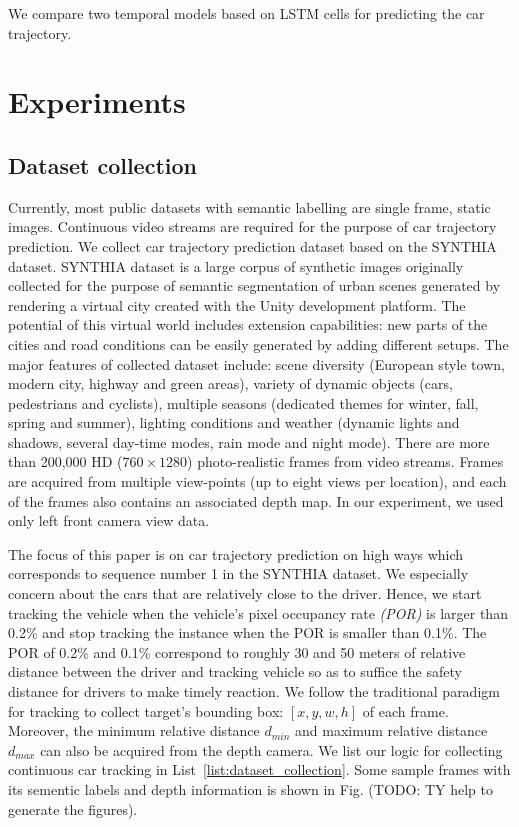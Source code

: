 \documentclass[10pt,twocolumn,letterpaper]{article}
\begin{document}
We compare two temporal models based on LSTM cells for predicting the car trajectory.

\section{Experiments}

\subsection{Dataset collection}

Currently, most public datasets with semantic labelling are single frame, static images. Continuous video streams are required for the purpose of car trajectory prediction.
We collect car trajectory prediction dataset based on the SYNTHIA~\cite{ros2016synthia} dataset.
SYNTHIA dataset is a large corpus of synthetic images originally collected for the purpose of semantic segmentation of urban scenes generated by rendering a virtual city created with the Unity development platform.
The potential of this virtual world includes extension capabilities: new parts of the cities and road conditions can be easily generated by adding different setups. The major features of collected dataset include: scene diversity (European style town, modern city, highway and green areas), variety of dynamic objects (cars, pedestrians and cyclists), multiple seasons (dedicated themes for winter, fall, spring and summer), lighting conditions and weather (dynamic lights and shadows, several day-time modes, rain mode and night mode).
There are more than 200,000 HD ($760\times1280$) photo-realistic frames from video streams.
Frames are acquired from multiple view-points (up to eight views per location), and each of the frames also contains an associated depth map. In our experiment, we used only left front camera view data.

The focus of this paper is on car trajectory prediction on high ways which corresponds to sequence number 1 in the SYNTHIA dataset. We especially concern about the cars that are relatively close to the driver. Hence, we start tracking the vehicle when the vehicle's pixel occupancy rate \emph{(POR)} is larger than 0.2\% and stop tracking the instance when the POR is smaller than 0.1\%. The POR of 0.2\% and 0.1\% correspond to roughly 30 and 50 meters of relative distance between the driver and tracking vehicle so as to suffice the safety distance for drivers to make timely reaction.
We follow the traditional paradigm for tracking to collect target's bounding box: $[x, y, w, h]$ of each frame. Moreover, the minimum relative distance $d_{min}$ and maximum relative distance $d_{max}$ can also be acquired from the depth camera.
We list our logic for collecting continuous car tracking in List~\ref{list:dataset_collection}. 
Some sample frames with its sementic labels and depth information is shown in Fig. (TODO: TY help to generate the figures).
\end{document}
